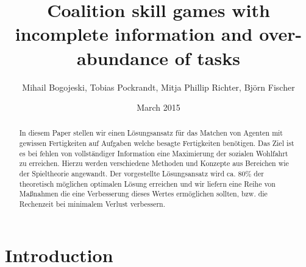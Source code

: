 \documentclass[fleqn,10pt]{article} %
\begin{document}
\title{Coalition skill games with incomplete information and over-abundance of tasks}
\author{Mihail Bogojeski, Tobias Pockrandt, Mitja Phillip Richter, Björn Fischer}
\date{March 2015}




\flushbottom %

\maketitle %


\begin{abstract}
In diesem Paper stellen wir einen Lösungsansatz für das Matchen von Agenten mit gewissen Fertigkeiten auf Aufgaben welche besagte Fertigkeiten benötigen. Das Ziel ist es bei fehlen von vollständiger Information eine Maximierung der sozialen Wohlfahrt zu erreichen. Hierzu werden verschiedene Methoden und Konzepte aus Bereichen wie der Spieltheorie angewandt. Der vorgestellte Lösungsansatz wird ca. 80\% der theoretisch möglichen optimalen Lösung erreichen und wir liefern eine Reihe von Maßnahmen die eine Verbesserung dieses Wertes ermöglichen sollten, bzw. die Rechenzeit bei minimalem Verlust verbessern.
\end{abstract}


\thispagestyle{empty} %


\section*{Introduction} %
\label{sec:introduction}
\end{document}
